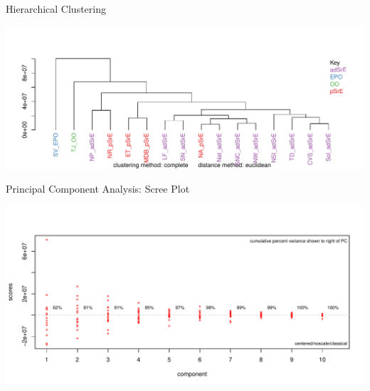 \documentclass[aspectratio=169]{beamer}\usepackage[]{graphicx}\usepackage[]{color}
\makeatletter
\def\maxwidth{ %
  \ifdim\Gin@nat@width>\linewidth
    \linewidth
  \else
    \Gin@nat@width
  \fi
}
\newenvironment{knitrout}{}{} %
\makeatother
\begin{document}
\begin{frame}{Hierarchical Clustering}

\begin{knitrout}
\color{fgcolor}
\includegraphics[width=\maxwidth]{figure/HCA-1} 

\end{knitrout}

\end{frame}


\begin{frame}{Principal Component Analysis: Scree Plot}

\begin{knitrout}
\color{fgcolor}
\includegraphics[width=\maxwidth]{figure/scree-1} 

\end{knitrout}

\end{frame}

\end{document}
